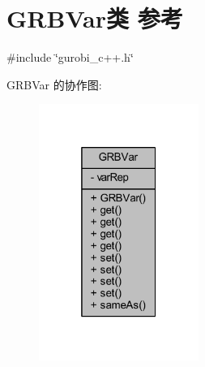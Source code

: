 \hypertarget{classGRBVar}{}\section{G\+R\+B\+Var类 参考}
\label{classGRBVar}


{\ttfamily \#include \char`\"{}gurobi\+\_\+c++.\+h\char`\"{}}



G\+R\+B\+Var 的协作图\+:
\nopagebreak
\begin{figure}[H]
\begin{center}
\leavevmode
\includegraphics[width=148pt]{classGRBVar__coll__graph}
\end{center}
\end{figure}
